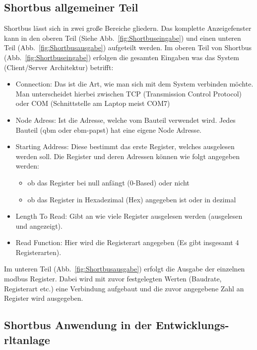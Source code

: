 \subsection{Shortbus allgemeiner Teil}
Shortbus lässt sich in zwei große Bereiche gliedern. Das komplette Anzeigefenster kann in den oberen Teil (Siehe Abb.~\ref{fig:Shortbuseingabe}) und einen unteren Teil (Abb.~\ref{fig:Shortbusausgabe}) aufgeteilt werden.
Im oberen Teil von Shortbus (Abb.~\ref{fig:Shortbuseingabe}) erfolgen die gesamten Eingaben was das System (Client/Server Architektur) betrifft:
\begin{itemize}
	\item Connection: Das ist die Art, wie man sich mit dem System verbinden möchte. Man unterscheidet hierbei zwischen TCP (Transmission Control Protocol) oder COM (Schnittstelle am Laptop meist COM7)
	
	\item Node Adress: Ist die Adresse, welche vom Bauteil verwendet wird. Jedes Bauteil (\zB \gls{qbm}  oder ebm-papst) hat eine eigene Node Adresse.
	
	\item Starting Address: Diese bestimmt das erste Register, welches ausgelesen werden soll. Die Register und deren Adressen können wie folgt angegeben werden:
		\begin{itemize}
			\item ob das Register bei null anfängt (0-Based) oder nicht
			\item ob das Register in Hexadezimal (Hex) angegeben ist oder in dezimal
		\end{itemize}
	\item Length To Read: Gibt an wie viele Register ausgelesen werden (ausgelesen und angezeigt).
	\item Read Function: Hier wird die Registerart angegeben (Es gibt insgesamt 4 Registerarten).
\end{itemize}

Im unteren Teil (Abb.~\ref{fig:Shortbusausgabe}) erfolgt die Ausgabe der einzelnen \gls{modbus} Register. Dabei wird mit zuvor festgelegten Werten (Baudrate, Registerart etc.) eine Verbindung aufgebaut und die zuvor angegebene Zahl an Register wird ausgegeben. 


  

\subsection{Shortbus Anwendung in der Entwicklungs- \ac{rltanlage}}

